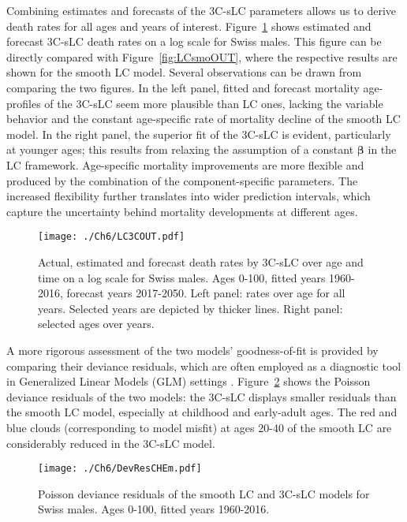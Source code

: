 \documentclass[Thesis]{subfiles}
\begin{document}
Combining estimates and forecasts of the 3C-sLC parameters allows us to derive death rates for all ages and years of interest. Figure~\ref{fig:LC3COUT} shows estimated and forecast 3C-sLC death rates on a log scale for Swiss males. This figure can be directly compared with Figure~\ref{fig:LCsmoOUT}, where the respective results are shown for the smooth LC model. Several observations can be drawn from comparing the two figures. In the left panel, fitted and forecast mortality age-profiles of the 3C-sLC seem more plausible than LC ones, lacking the variable behavior and the constant age-specific rate of mortality decline of the smooth LC model. In the right panel, the superior fit of the 3C-sLC is evident, particularly at younger ages; this results from relaxing the assumption of a constant $\bm{\beta}$ in the LC framework. Age-specific mortality improvements are more flexible and produced by the combination of the component-specific parameters. The increased flexibility further translates into wider prediction intervals, which capture the uncertainty behind mortality developments at different ages.

\begin{figure}[!ht]\centering
	\texttt{[image: ./Ch6/LC3COUT.pdf]}
	\caption{\label{fig:LC3COUT} Actual, estimated and forecast death rates by 3C-sLC over age and time on a log scale for Swiss males. Ages 0-100, fitted years 1960-2016, forecast years 2017-2050. Left panel: rates over age for all years. Selected years are depicted by thicker lines. Right panel: selected ages over years.}  
\end{figure}

A more rigorous assessment of the two models' goodness-of-fit is provided by comparing their deviance residuals, which are often employed as a diagnostic tool in Generalized Linear Models (GLM) settings \cite[for an overview and the formulas for their computation, please refer to][]{mccullagh1989glm}. Figure~\ref{fig:Ch6PoissonDevRes} shows the Poisson deviance residuals of the two models: the 3C-sLC displays smaller residuals than the smooth LC model, especially at childhood and early-adult ages. The red and blue clouds (corresponding to model misfit) at ages 20-40 of the smooth LC are considerably reduced in the 3C-sLC model.

\begin{figure}[!ht]\centering
	\texttt{[image: ./Ch6/DevResCHEm.pdf]}
	\caption{\label{fig:Ch6PoissonDevRes} Poisson deviance residuals of the smooth LC and 3C-sLC models for Swiss males. Ages 0-100, fitted years 1960-2016.}  
\end{figure}
\end{document}
